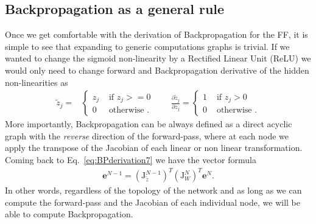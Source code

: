 \subsection{Backpropagation as a general rule}
%
Once we get comfortable with the derivation of Backpropagation for the FF, it is simple to see that expanding to generic computations graphs is trivial. If we wanted to change the sigmoid non-linearity by a Rectified Linear Unit (ReLU) we would only need to change forward and Backpropagation derivative of the hidden non-linearities as
\begin{align}
 \tilde{z}_j =
  &\begin{cases}
      z_j  &  \mbox{ if } z_j >= 0\\
      0  &  \mbox{ otherwise }.
  \end{cases} \quad \quad \frac{\partial \tilde{z}_{j}}{\partial z_{j}} = \begin{cases}
      1  &  \mbox{ if } z_j > 0\\
      0  &  \mbox{ otherwise }.
  \end{cases}
  \label{eqn:relu}
\end{align}
%
More importantly, Backpropagation can be always defined as a direct acyclic graph with the \textit{reverse} direction of the forward-pass, where at each node we apply the transpose of the Jacobian of each linear or non linear transformation. Coming back to Eq.~\ref{eq:BPderivation7} we have the vector formula
%
\begin{align}
        \mathbf{e}^{N-1} = \left(\mathbf{\mathrm{J}}_{\tilde{z}}^{N-1}\right)^T \left(\mathbf{\mathrm{J}}_{W}^N\right)^T \mathbf{e}^N.
\label{eq:BPderivation5}
\end{align}
%
In other words, regardless of the topology of the network and as long as we can compute the forward-pass and the Jacobian of each individual node, we will be able to compute Backpropagation.
